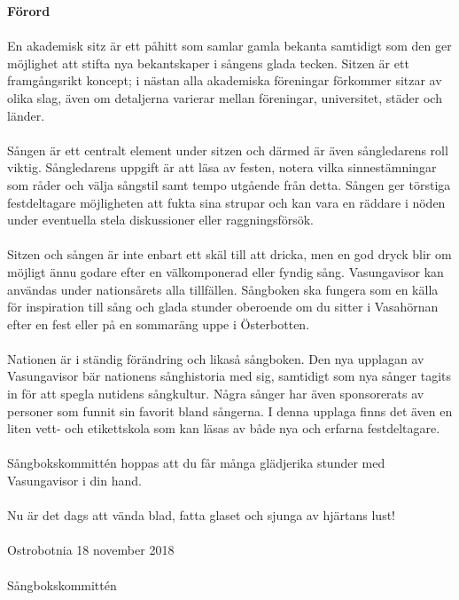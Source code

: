 \begin{scriptsize}

\flushleft\textbf{Förord}\\
~\\
En akademisk sitz är ett påhitt som samlar gamla bekanta samtidigt som den ger möjlighet att stifta nya bekantskaper i sångens glada tecken. Sitzen är ett framgångsrikt koncept; i nästan alla akademiska föreningar förkommer sitzar av olika slag, även om detaljerna varierar mellan föreningar, universitet, städer och länder.
\\
~\\
Sången är ett centralt element under sitzen och därmed är även sångledarens roll viktig. Sångledarens uppgift är att läsa av festen, notera vilka sinnestämningar som råder och välja sångstil samt tempo utgående från detta. Sången ger törstiga festdeltagare möjligheten att fukta sina strupar och kan vara en räddare i nöden under eventuella stela diskussioner eller raggningsförsök.
\\
~\\
Sitzen och sången är inte enbart ett skäl till att dricka, men en god dryck blir om möjligt ännu godare efter en välkomponerad eller fyndig sång. Vasungavisor kan användas under nationsårets alla tillfällen. Sångboken ska fungera som en källa för inspiration till sång och glada stunder oberoende om du sitter i Vasahörnan efter en fest eller på en sommaräng uppe i Österbotten.
\\
~\\
Nationen är i ständig förändring och likaså sångboken. Den nya upplagan av Vasungavisor bär nationens sånghistoria med sig, samtidigt som nya sånger tagits in för att spegla nutidens sångkultur. Några sånger har även sponsorerats av personer som funnit sin favorit bland sångerna. I denna upplaga finns det även en liten vett- och etikettskola som kan läsas av både nya och erfarna festdeltagare. 
\\
~\\
Sångbokskommittén hoppas att du får många glädjerika stunder med Vasungavisor i din hand.
\\
~\\
Nu är det dags att vända blad, fatta glaset och sjunga av hjärtans lust!
\\
~\\
Ostrobotnia 18 november 2018
\\
~\\
Sångbokskommittén
\end{scriptsize}
